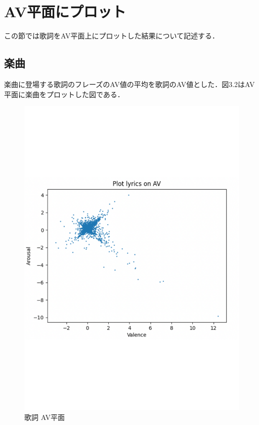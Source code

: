 \section{AV平面にプロット}
この節では歌詞をAV平面上にプロットした結果について記述する．

\subsection{楽曲}
楽曲に登場する歌詞のフレーズのAV値の平均を歌詞のAV値とした．図3.2はAV平面に楽曲をプロットした図である．
\begin{figure}[h]
    \centering
    \includegraphics[width=12cm]{lyrics_AV.pdf}
    \vspace{0mm}
    \caption{歌詞 AV平面}
    \label{fig:vkall}
    \vspace{5mm}
\end{figure}


